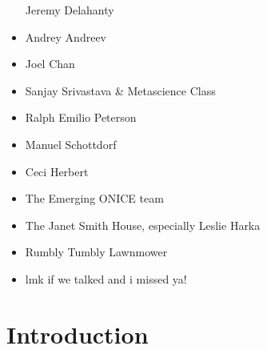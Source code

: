 \documentclass[10pt]{article}
\begin{document}
\begin{itemize}
  Jeremy Delahanty
\item
  Andrey Andreev
\item
  Joel Chan
\item
  Sanjay Srivastava \& Metascience Class
\item
  Ralph Emilio Peterson
\item
  Manuel Schottdorf
\item
  Ceci Herbert
\item
  The Emerging ONICE team
\item
  The Janet Smith House, especially Leslie Harka
\item
  Rumbly Tumbly Lawnmower
\item
  lmk if we talked and i missed ya!
\end{itemize}

\hypertarget{introduction}{%
\section{Introduction}\label{introduction}}
\end{document}

